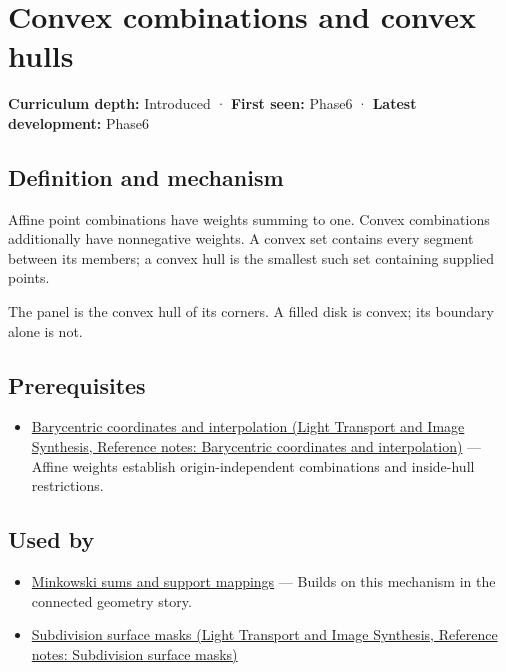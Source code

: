 \hypertarget{appendix-0026ec42c9d5}{}\label{referencestart:appendix-0026ec42c9d5}
\section{Convex combinations and convex hulls}\label{appendix-0026ec42c9d5-convex-combinations-and-convex-hulls}

\textbf{Curriculum depth:} Introduced · \textbf{First seen:} Phase6 · \textbf{Latest development:} Phase6

\subsection{Definition and mechanism}\label{appendix-0026ec42c9d5-definition-and-mechanism}

Affine point combinations have weights summing to one. Convex combinations additionally have nonnegative weights. A convex set contains every segment between its members; a convex hull is the smallest such set containing supplied points.

The panel is the convex hull of its corners. A filled disk is convex; its boundary alone is not.

\subsection{Prerequisites}\label{appendix-0026ec42c9d5-prerequisites}

\begin{itemize}
\tightlist
\item
  \href{../04-Light-Transport-and-Image-Synthesis/main.pdf\#nameddest=appendix-02b9d9a81dca}{Barycentric coordinates and interpolation (Light Transport and Image Synthesis, Reference notes: Barycentric coordinates and interpolation)} --- Affine weights establish origin-independent combinations and inside-hull restrictions.
\end{itemize}

\subsection{Used by}\label{appendix-0026ec42c9d5-used-by}

\begin{itemize}
\tightlist
\item
  \hyperref[appendix-215ac7099a82]{Minkowski sums and support mappings} --- Builds on this mechanism in the connected geometry story.
\item
  \href{../04-Light-Transport-and-Image-Synthesis/main.pdf\#nameddest=appendix-0234ab7f86b1}{Subdivision surface masks (Light Transport and Image Synthesis, Reference notes: Subdivision surface masks)}
\end{itemize}

